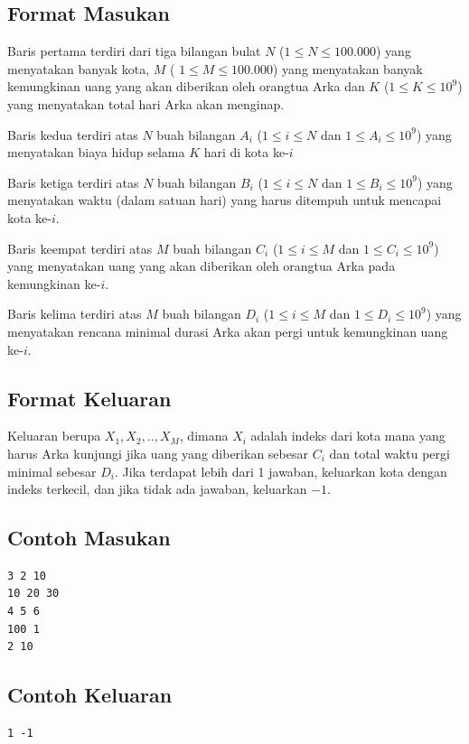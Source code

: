 \documentclass{article}
\begin{document}
\subsection*{Format Masukan}
Baris pertama terdiri dari tiga bilangan bulat $N$ ($1 \leq N \leq 100.000$) yang menyatakan banyak kota, $M$ ( $1 \leq M \leq 100.000$) yang menyatakan banyak kemungkinan uang yang akan diberikan oleh orangtua Arka dan $K$ ($1 \leq K \leq 10^9$) yang menyatakan total hari Arka akan menginap.

Baris kedua terdiri atas $N$ buah bilangan $A_i$ ($1 \leq i \leq N$ dan $1 \leq A_i \leq 10^9$) yang menyatakan biaya hidup selama $K$ hari di kota ke-$i$

Baris ketiga terdiri atas $N$ buah bilangan $B_i$ ($1 \leq i \leq N$ dan $1 \leq B_i \leq 10^9$) yang menyatakan waktu (dalam satuan hari) yang harus ditempuh untuk mencapai kota ke-$i$.

Baris keempat terdiri atas $M$ buah bilangan $C_i$ ($1 \leq i \leq M$ dan $1 \leq C_i \leq 10^9$) yang menyatakan uang yang akan diberikan oleh orangtua Arka pada kemungkinan ke-$i$.

Baris kelima terdiri atas $M$ buah bilangan $D_i$ ($1 \leq i \leq M$ dan $1 \leq D_i \leq 10^9$) yang menyatakan rencana minimal durasi Arka akan pergi untuk kemungkinan uang ke-$i$.

\subsection*{Format Keluaran}
Keluaran berupa $X_1,X_2,..,X_M$, dimana $X_i$ adalah indeks dari kota mana yang harus Arka kunjungi jika uang yang diberikan sebesar $C_i$ dan total waktu pergi minimal sebesar $D_i$. Jika terdapat lebih dari 1 jawaban, keluarkan kota dengan indeks terkecil, dan jika tidak ada jawaban, keluarkan $-1$.

\begin{multicols}{2}
\subsection*{Contoh Masukan}
\begin{lstlisting}
3 2 10
10 20 30
4 5 6
100 1
2 10
\end{lstlisting}
\columnbreak
\subsection*{Contoh Keluaran}
\begin{lstlisting}
1 -1
\end{lstlisting}
\vfill
\null
\end{multicols}
\end{document}
